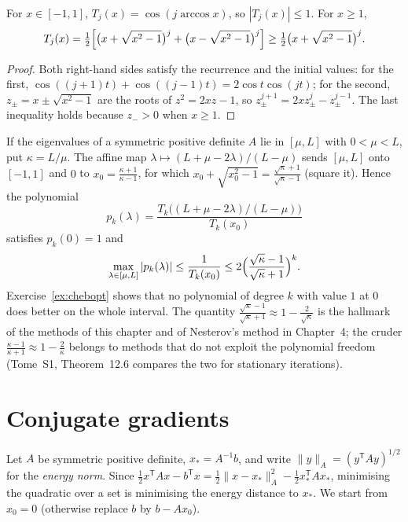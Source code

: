 \begin{lemma}\label{lem:chebyshev}
For $x\in[-1,1]$, $T_j(x)=\cos(j\arccos x)$, so $|T_j(x)|\le1$. For $x\ge1$,
\[
T_j(x)=\tfrac12\Bigl[\bigl(x+\sqrt{x^2-1}\bigr)^j+\bigl(x-\sqrt{x^2-1}\bigr)^j\Bigr]\ge\tfrac12\bigl(x+\sqrt{x^2-1}\bigr)^j.
\]
\end{lemma}
\begin{proof}
Both right-hand sides satisfy the recurrence and the initial values: for the first, $\cos((j+1)t)+\cos((j-1)t)=2\cos t\cos(jt)$; for the second, $z_\pm=x\pm\sqrt{x^2-1}$
are the roots of $z^2=2xz-1$, so $z_\pm^{j+1}=2xz_\pm^j-z_\pm^{j-1}$. The last inequality holds because $z_->0$ when $x\ge1$.
\end{proof}

If the eigenvalues of a symmetric positive definite $A$ lie in $[\mu,L]$ with $0<\mu<L$, put $\kappa=L/\mu$. The affine map $\lambda\mapsto(L+\mu-2\lambda)/(L-\mu)$
sends $[\mu,L]$ onto $[-1,1]$ and $0$ to $x_0=\frac{\kappa+1}{\kappa-1}$, for which $x_0+\sqrt{x_0^2-1}=\frac{\sqrt\kappa+1}{\sqrt\kappa-1}$ (square it). Hence the polynomial
\begin{equation}\label{eq:chebpoly}
p_k(\lambda)=\frac{T_k\bigl((L+\mu-2\lambda)/(L-\mu)\bigr)}{T_k(x_0)}
\end{equation}
satisfies $p_k(0)=1$ and
\[
\max_{\lambda\in[\mu,L]}|p_k(\lambda)|\le\frac1{T_k(x_0)}\le2\Bigl(\frac{\sqrt\kappa-1}{\sqrt\kappa+1}\Bigr)^k.
\]
Exercise~\ref{ex:chebopt} shows that no polynomial of degree $k$ with value $1$ at $0$ does better on the whole interval. The quantity
$\frac{\sqrt\kappa-1}{\sqrt\kappa+1}\approx1-\frac2{\sqrt\kappa}$ is the hallmark of the methods of this chapter and of Nesterov's method in
Chapter~4; the cruder $\frac{\kappa-1}{\kappa+1}\approx1-\frac2\kappa$ belongs to methods that do not exploit the polynomial freedom (Tome~S1, Theorem~12.6 compares the
two for stationary iterations).

\section{Conjugate gradients}\label{sec:cg}

Let $A$ be symmetric positive definite, $x_*=A^{-1}b$, and write $\|y\|_A=(y^{\mathsf T}Ay)^{1/2}$ for the \emph{energy norm}. Since
$\frac12x^{\mathsf T}Ax-b^{\mathsf T}x=\frac12\|x-x_*\|_A^2-\frac12x_*^{\mathsf T}Ax_*$, minimising the quadratic over a set is minimising the energy distance to $x_*$. We
start from $x_0=0$ (otherwise replace $b$ by $b-Ax_0$).

